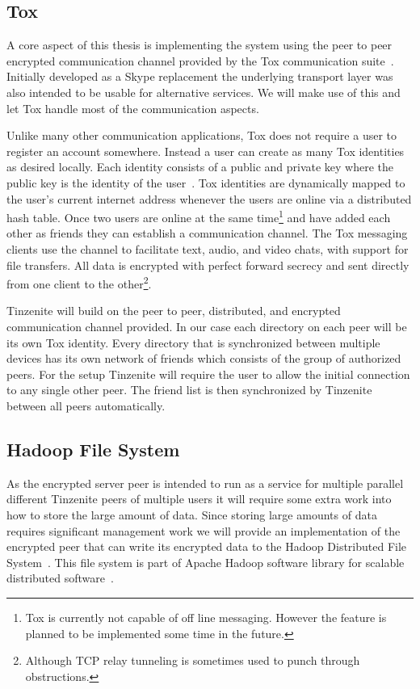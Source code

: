 \subsection{Tox}
\label{sub:Tox}

A core aspect of this thesis is implementing the system using the peer to peer encrypted communication channel provided by the Tox communication suite~\cite{web:site:tox}.
Initially developed as a Skype replacement the underlying transport layer was also intended to be usable for alternative services.
We will make use of this and let Tox handle most of the communication aspects.

Unlike many other communication applications, Tox does not require a user to register an account somewhere.
Instead a user can create as many Tox identities as desired locally.
Each identity consists of a public and private key where the public key is the identity of the user~\cite{web:site:tox:crypto}.
Tox identities are dynamically mapped to the user's current internet address whenever the users are online via a distributed hash table.
Once two users are online at the same time\footnote{Tox is currently not capable of off line messaging. However the feature is planned to be implemented some time in the future.} and have added each other as friends they can establish a communication channel.
The Tox messaging clients use the channel to facilitate text, audio, and video chats, with support for file transfers.
All data is encrypted with perfect forward secrecy and sent directly from one client to the other\footnote{Although TCP relay tunneling is sometimes used to punch through obstructions.}.

Tinzenite will build on the peer to peer, distributed, and encrypted communication channel provided.
In our case each directory on each peer will be its own Tox identity.
Every directory that is synchronized between multiple devices has its own network of friends which consists of the group of authorized peers.
For the setup Tinzenite will require the user to allow the initial connection to any single other peer.
The friend list is then synchronized by Tinzenite between all peers automatically.

\subsection{Hadoop File System}
\label{sub:Hadoop File System}

As the encrypted server peer is intended to run as a service for multiple parallel different Tinzenite peers of multiple users it will require some extra work into how to store the large amount of data.
Since storing large amounts of data requires significant management work we will provide an implementation of the encrypted peer that can write its encrypted data to the Hadoop Distributed File System~\cite{borthakur2007hadoop}.
This file system is part of Apache Hadoop software library for scalable distributed software~\cite{web:site:hadoop}.

